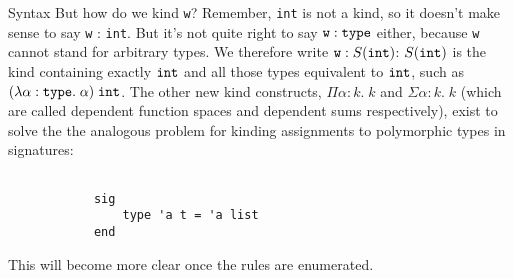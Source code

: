 \documentclass{amsart}
\newcommand{\type}{\ensuremath{\mathtt{type}}}
\begin{document}
\begin{section}{Syntax}
    But how do we kind \verb|w|? Remember, \verb|int| is not a kind, so it doesn't make sense to say \verb|w| : \verb|int|. But it's not quite right to say $\verb|w| : \type$ either, because \verb|w| cannot stand for arbitrary types. We therefore write $\verb|w| : S(\verb|int|)$: $S(\verb|int|)$ is the kind containing exactly $\verb|int|$ and all those types equivalent to $\verb|int|$, such as $(\lambda \alpha : \type. \; \alpha) \; \verb|int|$. The other new kind constructs, $\Pi \alpha : k. \; k$ and $\Sigma \alpha : k. \; k$ (which are called dependent function spaces and dependent sums respectively), exist to solve the the analogous problem for kinding assignments to polymorphic types in signatures:
        \begin{verbatim}

            sig
                type 'a t = 'a list
            end
        \end{verbatim}
    This will become more clear once the rules are enumerated.
    \newpage

\end{section}
\end{document}

